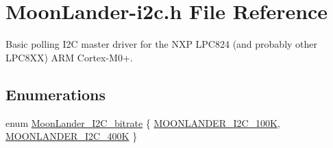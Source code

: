\hypertarget{MoonLander-i2c_8h}{}\section{Moon\+Lander-\/i2c.h File Reference}
\label{MoonLander-i2c_8h}


Basic polling I2C master driver for the N\+XP L\+P\+C824 (and probably other L\+P\+C8\+XX) A\+RM Cortex-\/\+M0+.  


\subsection*{Enumerations}
\begin{DoxyCompactItemize}
\item 
enum \hyperlink{MoonLander-i2c_8h_a99b692076d07b714e6b130bdc715e3ee}{Moon\+Lander\+\_\+\+I2\+C\+\_\+bitrate} \{ \hyperlink{MoonLander-i2c_8h_a99b692076d07b714e6b130bdc715e3eea9a053bd0e23847d1237ee0dfbd0af724}{M\+O\+O\+N\+L\+A\+N\+D\+E\+R\+\_\+\+I2\+C\+\_\+100K}, 
\hyperlink{MoonLander-i2c_8h_a99b692076d07b714e6b130bdc715e3eeabb3ce3f508f70b572e65570bec3688d5}{M\+O\+O\+N\+L\+A\+N\+D\+E\+R\+\_\+\+I2\+C\+\_\+400K}
 \}
\end{DoxyCompactItemize}
